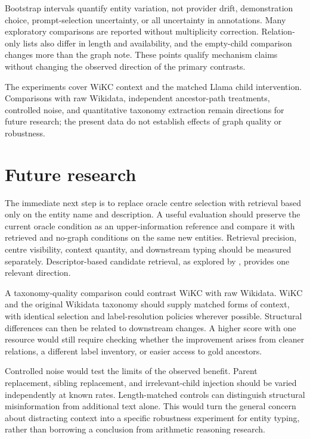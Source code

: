 Bootstrap intervals quantify entity variation, not provider drift, demonstration choice, prompt-selection uncertainty, or all uncertainty in annotations. Many exploratory comparisons are reported without multiplicity correction. Relation-only lists also differ in length and availability, and the empty-child comparison changes more than the graph note. These points qualify mechanism claims without changing the observed direction of the primary contrasts.


The experiments cover WiKC context and the matched Llama child intervention. Comparisons with raw Wikidata, independent ancestor-path treatments, controlled noise, and quantitative taxonomy extraction remain directions for future research; the present data do not establish effects of graph quality or robustness.


\FloatBarrier

\section{Future research}

The immediate next step is to replace oracle centre selection with retrieval based only on the entity name and description. A useful evaluation should preserve the current oracle condition as an upper-information reference and compare it with retrieved and no-graph conditions on the same new entities. Retrieval precision, centre visibility, context quantity, and downstream typing should be measured separately. Descriptor-based candidate retrieval, as explored by \citet{ma2026}, provides one relevant direction.


A taxonomy-quality comparison could contrast WiKC with raw Wikidata. WiKC and the original Wikidata taxonomy should supply matched forms of context, with identical selection and label-resolution policies wherever possible. Structural differences can then be related to downstream changes. A higher score with one resource would still require checking whether the improvement arises from cleaner relations, a different label inventory, or easier access to gold ancestors.


Controlled noise would test the limits of the observed benefit. Parent replacement, sibling replacement, and irrelevant-child injection should be varied independently at known rates. Length-matched controls can distinguish structural misinformation from additional text alone. This would turn the general concern about distracting context into a specific robustness experiment for entity typing, rather than borrowing a conclusion from arithmetic reasoning research.


